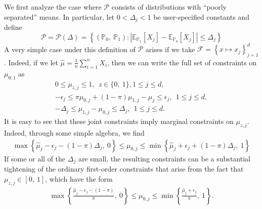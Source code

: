 \documentclass[11pt,twoside]{article}
\newcommand{\E}{\mathbb{E}}
\renewcommand{\P}{\mathbb{P}}
\newcommand{\bits}{\lbrace 0,~1\rbrace}
\newcommand{\dists}{\mathcal{P}}
\newcommand{\funcs}{\mathcal{F}}
\begin{document}
We first analyze the case where $\dists$ consists of distributions with ``poorly separated'' means. In particular, let $0 < \Delta_{j} < 1$ be user-specified
constants and define
\begin{equation}\label{eq:}
\dists = \dists\left(\Delta\right) = \left\lbrace \left(\P_{0},~\P_{1}\right) \colon \left|\E_{\P_{1}}\left[X_{j}\right] - \E_{\P_{0}}\left[X_{j}\right]\right| \leq \Delta_{j} \right\rbrace 
\end{equation}
A very simple case under this definition of $\dists$ arises if we take $\funcs = \left\lbrace x \mapsto x_{j} \right\rbrace_{j = 1}^{d}$. Indeed, if we let
$\hat{\mu} = \frac{1}{n}\sum_{i = 1}^{n} X_{i}$, then we can write the full set of constraints on $\mu_{0:1}$ as
\begin{align*}
0 \leq \mu_{z,j} \leq 1,~~ z \in \bits, 1 \leq j \leq d, \\
-\epsilon_{j} \leq \pi \mu_{0,j} + (1 - \pi) \mu_{1,j} - \hat{\mu}_{j} \leq \epsilon_{j},~~ 1 \leq j \leq d, \\
-\Delta_{j} \leq \mu_{1,j} - \mu_{0,j} \leq \Delta_{j}, ~~ 1 \leq j \leq d. 
\end{align*}
It is easy to see that these joint constraints imply marginal constraints on $\mu_{z,j}$. Indeed, through some simple algebra, we find
\begin{align*}
\max\left\lbrace \hat{\mu}_{j} - \epsilon_{j} - (1 - \pi)\Delta_{j},~ 0\right\rbrace \leq \mu_{0,j} \leq \min\left\lbrace\hat{\mu}_{j} + \epsilon_{j} + \left(1 - \pi\right)\Delta_{j},~1\right\rbrace 
\end{align*}
If some or all of the $\Delta_{j}$ are small, the resulting constraints can be a substantial tightening of the ordinary first-order constraints that arise from the fact that $\mu_{z,j} \in \left[0,~1\right]$, which have the form
\begin{align*}
\max\left\lbrace \frac{\hat{\mu}_{j} - \epsilon_{j} - \left(1 - \pi\right)}{\pi},~0\right\rbrace \leq \mu_{0,j} \leq \min\left\lbrace \frac{\hat{\mu}_{j} + \epsilon_{j}}{\pi},~1\right\rbrace .
\end{align*}
\end{document}
